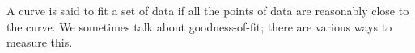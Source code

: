 A curve is said to fit a set of data if
all the points of data are reasonably close
to the curve. We sometimes talk about goodness-of-fit;
there are various ways to measure this.